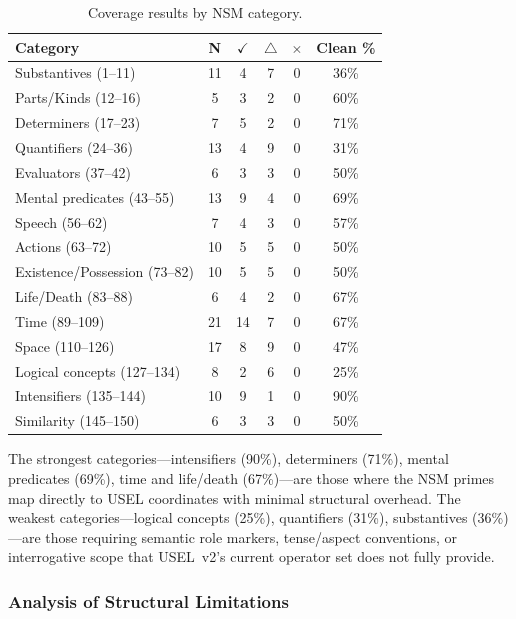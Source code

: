 \documentclass[11pt,a4paper]{article}
\begin{document}
\begin{table}[h!]
\centering
\caption{Coverage results by NSM category.}
\label{tab:coverage-by-category}
\small
\begin{tabular}{lccccc}
\toprule
\textbf{Category} & \textbf{N} & $\checkmark$ & $\triangle$ & $\times$ & \textbf{Clean \%} \\
\midrule
Substantives (1--11) & 11 & 4 & 7 & 0 & 36\% \\
Parts/Kinds (12--16) & 5 & 3 & 2 & 0 & 60\% \\
Determiners (17--23) & 7 & 5 & 2 & 0 & 71\% \\
Quantifiers (24--36) & 13 & 4 & 9 & 0 & 31\% \\
Evaluators (37--42) & 6 & 3 & 3 & 0 & 50\% \\
Mental predicates (43--55) & 13 & 9 & 4 & 0 & 69\% \\
Speech (56--62) & 7 & 4 & 3 & 0 & 57\% \\
Actions (63--72) & 10 & 5 & 5 & 0 & 50\% \\
Existence/Possession (73--82) & 10 & 5 & 5 & 0 & 50\% \\
Life/Death (83--88) & 6 & 4 & 2 & 0 & 67\% \\
Time (89--109) & 21 & 14 & 7 & 0 & 67\% \\
Space (110--126) & 17 & 8 & 9 & 0 & 47\% \\
Logical concepts (127--134) & 8 & 2 & 6 & 0 & 25\% \\
Intensifiers (135--144) & 10 & 9 & 1 & 0 & 90\% \\
Similarity (145--150) & 6 & 3 & 3 & 0 & 50\% \\
\bottomrule
\end{tabular}
\end{table}

The strongest categories---intensifiers (90\%), determiners (71\%), mental predicates (69\%), time and life/death (67\%)---are those where the NSM primes map directly to USEL coordinates with minimal structural overhead. The weakest categories---logical concepts (25\%), quantifiers (31\%), substantives (36\%)---are those requiring semantic role markers, tense/aspect conventions, or interrogative scope that USEL~v2's current operator set does not fully provide.

\subsubsection{Analysis of Structural Limitations}
\end{document}

